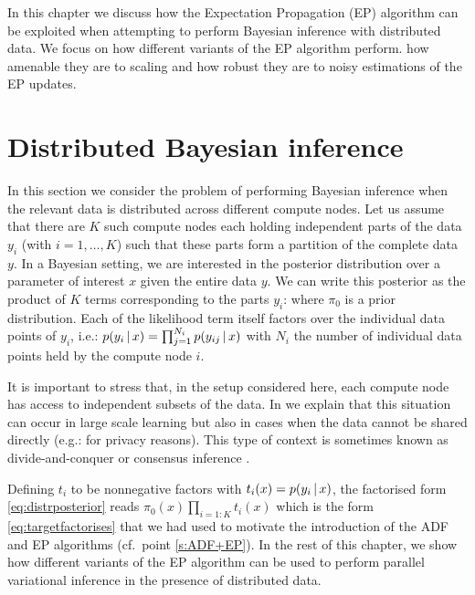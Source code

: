 
In this chapter we discuss how the Expectation Propagation (EP) algorithm can be exploited when attempting to perform Bayesian inference with distributed data. 
We focus on how different variants of the EP algorithm perform. how amenable they are to scaling and how robust they are to noisy estimations of the EP updates. 

\section{Distributed Bayesian inference}

In this section we consider the problem of performing Bayesian inference when the relevant data is distributed across different compute nodes. 
Let us assume that there are $K$ such compute nodes each holding independent parts of the data $y_i$ (with $i=1,\dots,K$) such that these parts form a partition of the complete data $y$. 
In a Bayesian setting, we are interested in the posterior distribution over a parameter of interest $x$ given the entire data $y$. We can write this posterior as the product of $K$ terms corresponding to the parts $y_i$: 
%
%
where $\pi_0$ is a prior distribution. Each of the likelihood term itself factors over the individual data points of $y_i$, i.e.: $p(y_i\,|\, x)=\prod_{j=1}^{N_i}p(y_{ij}\,|\, x)$ with $N_i$ the number of individual data points held by the compute node $i$.

It is important to stress that, in the setup considered here, each compute node has access to independent subsets of the data. In \citet{hasenclever16} we explain that this situation can occur in large scale learning but also in cases when the data cannot be shared directly (e.g.: for privacy reasons). This type of context is sometimes known as divide-and-conquer or consensus inference \citep{kleiner14,battey15,zhao16}. 

Defining $t_i$ to be nonnegative factors with $t_i(x)=p(y_i\,|\, x)$, the factorised form \eqref{eq:distrposterior} reads $\pi_0(x)\prod_{i=1:K}t_i(x)$ which is the form \eqref{eq:targetfactorises} that we had used to motivate the introduction of the ADF and EP algorithms (cf.\ point \ref{s:ADF+EP}).
In the rest of this chapter, we show how different variants of the EP algorithm can be used to perform parallel variational inference in the presence of distributed data. 

